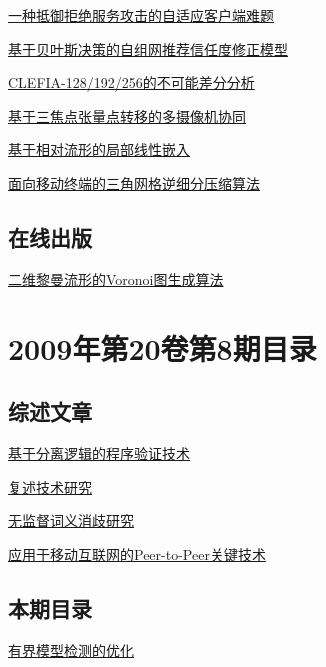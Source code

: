 \documentclass[a4paper]{article}
\begin{document}
\href{http://www.jos.org.cn/ch/reader/download_pdf.aspx?file_no=575&year_id=2009&quarter_id=9&falg=1}{一种抵御拒绝服务攻击的自适应客户端难题}

\href{http://www.jos.org.cn/ch/reader/download_pdf.aspx?file_no=579&year_id=2009&quarter_id=9&falg=1}{基于贝叶斯决策的自组网推荐信任度修正模型}

\href{http://www.jos.org.cn/ch/reader/download_pdf.aspx?file_no=576&year_id=2009&quarter_id=9&falg=1}{CLEFIA-128/192/256的不可能差分分析}

\href{http://www.jos.org.cn/ch/reader/download_pdf.aspx?file_no=3571&year_id=2009&quarter_id=9&falg=1}{基于三焦点张量点转移的多摄像机协同}

\href{http://www.jos.org.cn/ch/reader/download_pdf.aspx?file_no=3369&year_id=2009&quarter_id=9&falg=1}{基于相对流形的局部线性嵌入}

\href{http://www.jos.org.cn/ch/reader/download_pdf.aspx?file_no=3404&year_id=2009&quarter_id=9&falg=1}{面向移动终端的三角网格逆细分压缩算法}

\subsection{在线出版}
\href{http://www.jos.org.cn/ch/reader/download_pdf.aspx?file_no=3471&year_id=2009&quarter_id=9&falg=1}{二维黎曼流形的Voronoi图生成算法}


\section{\textbf{2009年第20卷第8期目录}}
\subsection{综述文章}
\href{http://www.jos.org.cn/ch/reader/download_pdf.aspx?file_no=3636&year_id=2009&quarter_id=8&falg=1}{基于分离逻辑的程序验证技术}

\href{http://www.jos.org.cn/ch/reader/download_pdf.aspx?file_no=3587&year_id=2009&quarter_id=8&falg=1}{复述技术研究}

\href{http://www.jos.org.cn/ch/reader/download_pdf.aspx?file_no=3566&year_id=2009&quarter_id=8&falg=1}{无监督词义消歧研究}

\href{http://www.jos.org.cn/ch/reader/download_pdf.aspx?file_no=3639&year_id=2009&quarter_id=8&falg=1}{应用于移动互联网的Peer-to-Peer关键技术}

\subsection{本期目录}
\href{http://www.jos.org.cn/ch/reader/download_pdf.aspx?file_no=3387&year_id=2009&quarter_id=8&falg=1}{有界模型检测的优化}
\end{document}
